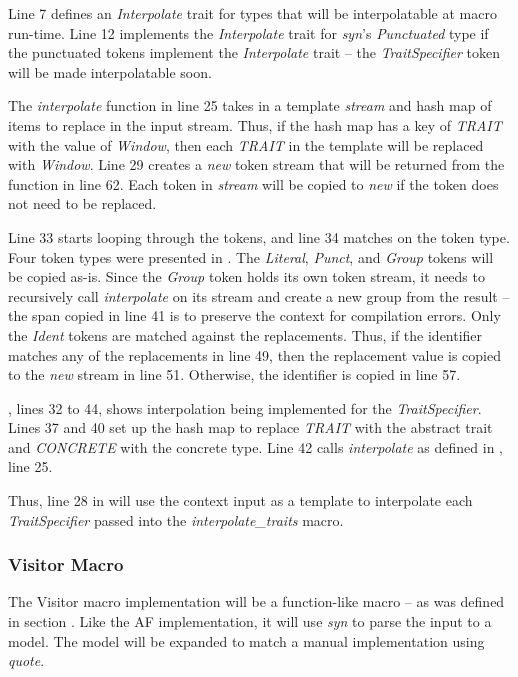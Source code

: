 Line 7 defines an \textit{Interpolate} trait for types that will be interpolatable at macro run-time.
Line 12 implements the \textit{Interpolate} trait for \textit{syn}'s \textit{Punctuated} type if the punctuated tokens implement the \textit{Interpolate} trait -- the \textit{TraitSpecifier} token will be made interpolatable soon.

The \textit{interpolate} function in line 25 takes in a template \textit{stream} and hash map of items to replace in the input stream.
Thus, if the hash map has a key of \textit{TRAIT} with the value of \textit{Window}, then each \textit{TRAIT} in the template will be replaced with \textit{Window}.
Line 29 creates a \textit{new} token stream that will be returned from the function in line 62.
Each token in \textit{stream} will be copied to \textit{new} if the token does not need to be replaced.

Line 33 starts looping through the tokens, and line 34 matches on the token type.
Four token types were presented in .
The \textit{Literal}, \textit{Punct}, and \textit{Group} tokens will be copied as-is.
Since the \textit{Group} token holds its own token stream, it needs to recursively call \textit{interpolate} on its stream and create a new group from the result -- the span copied in line 41 is to preserve the context for compilation errors.
Only the \textit{Ident} tokens are matched against the replacements.
Thus, if the identifier matches any of the replacements in line 49, then the replacement value is copied to the \textit{new} stream in line 51.
Otherwise, the identifier is copied in line 57.

, lines 32 to 44, shows interpolation being implemented for the \textit{TraitSpecifier}.
Lines 37 and 40 set up the hash map to replace \textit{TRAIT} with the abstract trait and \textit{CONCRETE} with the concrete type.
Line 42 calls \textit{interpolate} as defined in , line 25.

Thus, line 28 in  will use the context input as a template to interpolate each \textit{TraitSpecifier} passed into the \textit{interpolate\_traits} macro.

\subsubsection{Visitor Macro}
The Visitor macro implementation will be a function-like macro -- as was defined in section .
Like the AF implementation, it will use \textit{syn} to parse the input to a model.
The model will be expanded to match a manual implementation using \textit{quote}.

